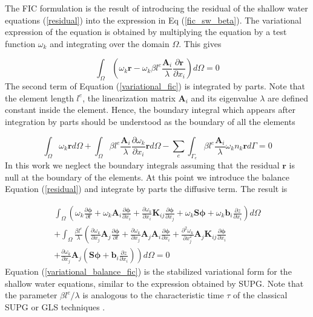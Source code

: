 \documentclass[a4paper,12pt]{elsarticle}
\newcommand{\pder}[2]{\frac{\partial#1}{\partial#2}}
\newcommand{\ppder}[2]{\frac{\partial^2#1}{\partial#2^2}}
\begin{document}
The FIC formulation is the result of introducing the residual of the shallow water equations (\ref{residual}) into the expression in Eq (\ref{fic_sw_beta}). The variational expression of the equation is obtained by multiplying the equation by a test function $\omega_k$ and integrating over the domain $\Omega$. This gives

\begin{equation} \label{variational_fic}
\int_\Omega \left(
    \omega_k \mathbf{r} - \omega_k \beta l^e\frac{\mathbf{A}_i}{\lambda}\pder{\mathbf{r}}{x_i}
\right) d\Omega = 0
\end{equation}
The second term of Equation (\ref{variational_fic}) is integrated by parts. Note that the element length $l^e$, the linearization matrix $\mathbf{A}_i$ and its eigenvalue $\lambda$ are defined constant inside the element. Hence, the boundary integral which appears after integration by parts should be understood as the boundary of all the elements

\begin{equation} \label{variational_fic_parts}
\int_\Omega \omega_k \mathbf{r} d\Omega
+ \int_\Omega \beta l^e\frac{\mathbf{A}_i}{\lambda}\pder{\omega_k}{x_i} \mathbf{r} d\Omega
- \sum_e \int_{\Gamma_e} \beta l^e\frac{\mathbf{A}_i}{\lambda}\omega_kn_k \mathbf{r} d\Gamma = 0
\end{equation}
In this work we neglect the boundary integrals assuming that the residual $\mathbf{r}$ is null at the boundary of the elements. At this point we introduce the balance Equation (\ref{residual}) and integrate by parts the diffusive term. The result is

\begin{multline} \label{variational_balance_fic}
\int_\Omega \left(
    \omega_k \pder{\bm{\phi}}{t} + \omega_k \mathbf{A}_i\pder{\bm{\phi}}{x_i}
    + \pder{\omega_k}{x_i} \mathbf{K}_{ij} \pder{\bm{\phi}}{x_j} + \omega_k \mathbf{S}\bm{\phi} + \omega_k \mathbf{b}_i\pder{z}{x_i}
\right) d\Omega\\ +
\int_\Omega \frac{\beta l^e}{\lambda} \left(
    \pder{\omega_k}{x_j} \mathbf{A}_j \pder{\bm{\phi}}{t}
    + \pder{\omega_k}{x_j} \mathbf{A}_j\mathbf{A}_i\pder{\bm{\phi}}{x_i}
    + \ppder{\omega_k}{x_j} \mathbf{A}_j\mathbf{K}_{ij} \pder{\bm{\phi}}{x_i} \right. \\
    \left.
    + \pder{\omega_k}{x_j} \mathbf{A}_j \left( \mathbf{S}\bm{\phi} + \mathbf{b}_i\pder{z}{x_i} \right)
\right) d\Omega
=0
\end{multline}
Equation (\ref{variational_balance_fic}) is the stabilized variational form for the shallow water equations, similar to the expression obtained by SUPG. Note that the parameter $\beta l^e/\lambda$ is analogous to the characteristic time $\tau$ of the classical SUPG or GLS techniques \cite{cotela2016}.
\end{document}

